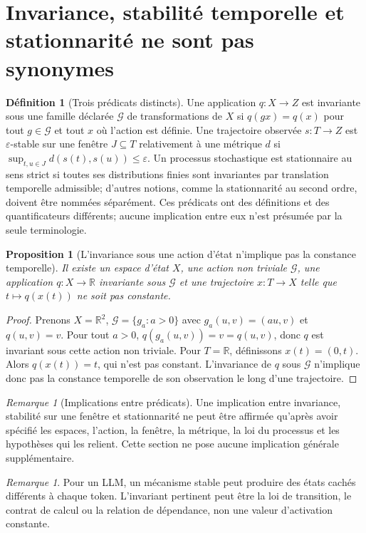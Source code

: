 \documentclass[11pt,oneside]{book}
\newtheorem{proposition}[theoreme]{Proposition}
\theoremstyle{definition}\newtheorem{definition}[theoreme]{Définition}\newtheorem{hypothese}[theoreme]{Hypothèse explicite}\newtheorem{convention}[theoreme]{Convention}\newtheorem{critere}[theoreme]{Critère}
\theoremstyle{remark}\newtheorem{remarque}[theoreme]{Remarque}\newtheorem{contreexemple}[theoreme]{Contre-exemple}
\begin{document}
\section{Invariance, stabilité temporelle et stationnarité ne sont pas synonymes}
\begin{definition}[Trois prédicats distincts]
Une application $q:X\to Z$ est invariante sous une famille déclarée $\mathcal G$ de transformations de $X$ si $q(gx)=q(x)$ pour tout $g\in\mathcal G$ et tout $x$ où l'action est définie. Une trajectoire observée $s:T\to Z$ est $\varepsilon$-stable sur une fenêtre $J\subseteq T$ relativement à une métrique $d$ si $\sup_{t,u\in J}d(s(t),s(u))\leq\varepsilon$. Un processus stochastique est stationnaire au sens strict si toutes ses distributions finies sont invariantes par translation temporelle admissible; d'autres notions, comme la stationnarité au second ordre, doivent être nommées séparément. Ces prédicats ont des définitions et des quantificateurs différents; aucune implication entre eux n'est présumée par la seule terminologie.
\end{definition}
\begin{proposition}[L'invariance sous une action d'état n'implique pas la constance temporelle]
Il existe un espace d'état $X$, une action non triviale $\mathcal G$, une application $q:X\to\mathbb R$ invariante sous $\mathcal G$ et une trajectoire $x:T\to X$ telle que $t\mapsto q(x(t))$ ne soit pas constante.
\end{proposition}
\begin{proof}
Prenons $X=\mathbb R^2$, $\mathcal G=\{g_a:a>0\}$ avec $g_a(u,v)=(au,v)$ et $q(u,v)=v$. Pour tout $a>0$, $q(g_a(u,v))=v=q(u,v)$, donc $q$ est invariant sous cette action non triviale. Pour $T=\mathbb R$, définissons $x(t)=(0,t)$. Alors $q(x(t))=t$, qui n'est pas constant. L'invariance de $q$ sous $\mathcal G$ n'implique donc pas la constance temporelle de son observation le long d'une trajectoire.
\end{proof}
\begin{remarque}[Implications entre prédicats]
Une implication entre invariance, stabilité sur une fenêtre et stationnarité ne peut être affirmée qu'après avoir spécifié les espaces, l'action, la fenêtre, la métrique, la loi du processus et les hypothèses qui les relient. Cette section ne pose aucune implication générale supplémentaire.
\end{remarque}
\begin{remarque}
Pour un LLM, un mécanisme stable peut produire des états cachés différents à chaque token. L'invariant pertinent peut être la loi de transition, le contrat de calcul ou la relation de dépendance, non une valeur d'activation constante.
\end{remarque}
\end{document}
